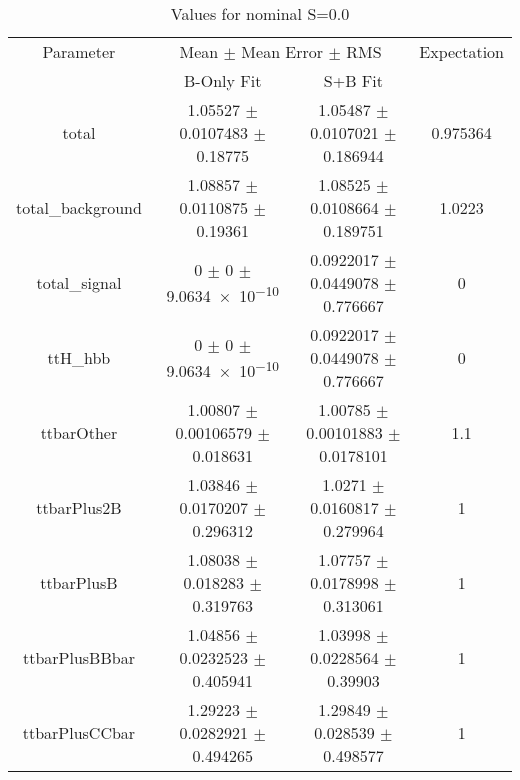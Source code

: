 \begin{table}
\centering
\caption{Values for nominal S=0.0}
\begin{tabular}{cccc}
\toprule
Parameter & \multicolumn{2}{c}{Mean $\pm$ Mean Error $\pm$ RMS} & Expectation\\
 & B-Only Fit & S+B Fit & \\
\midrule
total & \num{1.05527} $\pm$ \num{0.0107483} $\pm$ \num{0.18775} & \num{1.05487} $\pm$ \num{0.0107021} $\pm$ \num{0.186944} & \num{0.975364}\\
total\_background & \num{1.08857} $\pm$ \num{0.0110875} $\pm$ \num{0.19361} & \num{1.08525} $\pm$ \num{0.0108664} $\pm$ \num{0.189751} & \num{1.0223}\\
total\_signal & \num{0} $\pm$ \num{0} $\pm$ \num{9.0634e-10} & \num{0.0922017} $\pm$ \num{0.0449078} $\pm$ \num{0.776667} & \num{0}\\
ttH\_hbb & \num{0} $\pm$ \num{0} $\pm$ \num{9.0634e-10} & \num{0.0922017} $\pm$ \num{0.0449078} $\pm$ \num{0.776667} & \num{0}\\
ttbarOther & \num{1.00807} $\pm$ \num{0.00106579} $\pm$ \num{0.018631} & \num{1.00785} $\pm$ \num{0.00101883} $\pm$ \num{0.0178101} & \num{1.1}\\
ttbarPlus2B & \num{1.03846} $\pm$ \num{0.0170207} $\pm$ \num{0.296312} & \num{1.0271} $\pm$ \num{0.0160817} $\pm$ \num{0.279964} & \num{1}\\
ttbarPlusB & \num{1.08038} $\pm$ \num{0.018283} $\pm$ \num{0.319763} & \num{1.07757} $\pm$ \num{0.0178998} $\pm$ \num{0.313061} & \num{1}\\
ttbarPlusBBbar & \num{1.04856} $\pm$ \num{0.0232523} $\pm$ \num{0.405941} & \num{1.03998} $\pm$ \num{0.0228564} $\pm$ \num{0.39903} & \num{1}\\
ttbarPlusCCbar & \num{1.29223} $\pm$ \num{0.0282921} $\pm$ \num{0.494265} & \num{1.29849} $\pm$ \num{0.028539} $\pm$ \num{0.498577} & \num{1}\\
\bottomrule
\end{tabular}
\end{table}